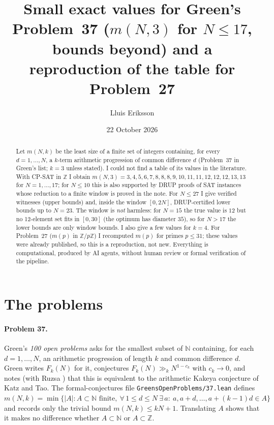 \documentclass[11pt]{article}
\title{Small exact values for Green's Problem~37 ($m(N,3)$ for $N\le 17$, bounds beyond) and a reproduction of the table for Problem~27}
\author{Lluis Eriksson}
\date{22 October 2026}
\begin{document}
\sloppy
\maketitle

\begin{abstract}
Let $m(N,k)$ be the least size of a finite set of integers containing, for every $d=1,\dots,N$, a $k$-term arithmetic progression of common difference $d$ (Problem~37 in Green's list; $k=3$ unless stated). I could not find a table of its values in the literature. With CP-SAT in $\mathbb Z$ I obtain $m(N,3)=3,4,5,6,7,8,8,8,9,10,11,11,12,12,12,13,13$ for $N=1,\dots,17$; for $N\le 10$ this is also supported by DRUP proofs of SAT instances whose reduction to a finite window is proved in the note. For $N\le 27$ I give verified witnesses (upper bounds) and, inside the window $[0,2N]$, DRUP-certified lower bounds up to $N=23$. The window is \emph{not} harmless: for $N=15$ the true value is $12$ but no 12-element set fits in $[0,30]$ (the optimum has diameter $35$), so for $N>17$ the lower bounds are only window bounds. I also give a few values for $k=4$. For Problem~27 ($m(p)$ in $\mathbb Z/p\mathbb Z$) I recomputed $m(p)$ for primes $p\le 31$; these values were already published, so this is a reproduction, not new. Everything is computational, produced by AI agents, without human review or formal verification of the pipeline.
\end{abstract}

\section{The problems}
\paragraph{Problem 37.} Green's \emph{100 open problems} \cite{green100} asks for the smallest subset of $\mathbb N$ containing, for each $d=1,\dots,N$, an arithmetic progression of length $k$ and common difference $d$. Green writes $F_k(N)$ for it, conjectures $F_k(N)\gg_k N^{1-c_k}$ with $c_k\to0$, and notes (with Ruzsa \cite{gr}) that this is equivalent to the arithmetic Kakeya conjecture of Katz and Tao. The formal-conjectures file \texttt{GreensOpenProblems/37.lean} \cite{fc} defines $m(N,k)=\min\{|A|: A\subset\mathbb N \text{ finite},\ \forall\, 1\le d\le N\ \exists\, a:\ a,a+d,\dots,a+(k-1)d\in A\}$ and records only the trivial bound $m(N,k)\le kN+1$. Translating $A$ shows that it makes no difference whether $A\subset\mathbb N$ or $A\subset\mathbb Z$.
\end{document}
